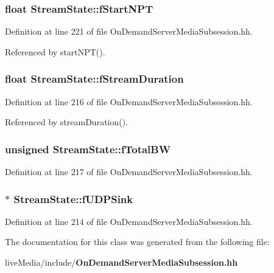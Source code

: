 \subsubsection[{f\+Start\+N\+P\+T}]{\setlength{\rightskip}{0pt plus 5cm}float Stream\+State\+::f\+Start\+N\+P\+T\hspace{0.3cm}{\ttfamily [private]}}\label{classStreamState_ab8b4ef89e753764d601ad642ddccc57b}


Definition at line 221 of file On\+Demand\+Server\+Media\+Subsession.\+hh.



Referenced by start\+N\+P\+T().

\subsubsection[{f\+Stream\+Duration}]{\setlength{\rightskip}{0pt plus 5cm}float Stream\+State\+::f\+Stream\+Duration\hspace{0.3cm}{\ttfamily [private]}}\label{classStreamState_ae686c1a352dc63f8567a80d0abc1ac6a}


Definition at line 216 of file On\+Demand\+Server\+Media\+Subsession.\+hh.



Referenced by stream\+Duration().

\subsubsection[{f\+Total\+B\+W}]{\setlength{\rightskip}{0pt plus 5cm}unsigned Stream\+State\+::f\+Total\+B\+W\hspace{0.3cm}{\ttfamily [private]}}\label{classStreamState_a6670c71b90010ea566439eb61d109c78}


Definition at line 217 of file On\+Demand\+Server\+Media\+Subsession.\+hh.

\subsubsection[{f\+U\+D\+P\+Sink}]{$\ast$ Stream\+State\+::f\+U\+D\+P\+Sink\hspace{0.3cm}{\ttfamily [private]}}\label{classStreamState_ad438b91aa56989fa231fcf7cc2c656b8}


Definition at line 214 of file On\+Demand\+Server\+Media\+Subsession.\+hh.



The documentation for this class was generated from the following file\+:\begin{DoxyCompactItemize}
\item 
live\+Media/include/{\bf On\+Demand\+Server\+Media\+Subsession.\+hh}\end{DoxyCompactItemize}
